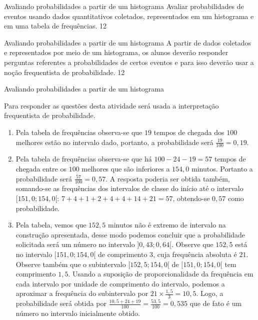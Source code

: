 \begin{objectives}{Avaliando probabilidades a partir de um histograma}
{
Avaliar probabilidades de eventos usando dados quantitativos coletados, representados em um histograma e em uma tabela de frequências.
}{1}{2}
\end{objectives}
\begin{sugestions}{Avaliando probabilidades a partir de um histograma}
{
A partir de dados coletados e representados por meio de um histograma, os alunos deverão responder perguntas referentes a probabilidades de certos eventos e para isso deverão usar a noção frequentista de probabilidade.
}{1}{2}
\end{sugestions}
\clearmargin
\marginpar{\vspace{.5em}}
\begin{answer}{Avaliando probabilidades a partir de um histograma}
{
Para responder as questões desta atividade será usada a interpretação frequentista de probabilidade.

\begin{enumerate}
\item Pela tabela de frequências observa-se que $19$ tempos de chegada dos $100$ melhores estão no intervalo dado, portanto, a probabilidade será $\frac{19}{100}=0{,}19$.

\item Pela tabela de frequências observa-se que há $100−24−19=57$ tempos de chegada entre os $100$ melhores que são inferiores a $154{,}0$ minutos. Portanto a probabilidade será $\frac{57}{100}=0{,}57$. A resposta poderia ser obtida também, somando-se as frequências dos intervalos de classe do início até o intervalo $[151{,}0 ; 154{,}0[$: $7+4+1+2+4+4+14+21=57$, obtendo-se $0{,}57$ como probabilidade.

\item Pela tabela, vemos que $152{,}5$ minutos não é extremo de intervalo na construção apresentada, desse modo podemos concluir que a probabilidade solicitada será um número no intervalo $]0{,}43 ; 0{,}64[$. Observe que $152{,}5$ está no intervalo $[151{,}0 ; 154{,}0[$ de comprimento 3, cuja frequência absoluta é $21$. Observe também que o subintervalo $[152{,}5; 154{,}0[$ de $[151{,}0 ; 154{,}0[$ tem comprimento $1{,}5$. Usando a suposição de proporcionalidade da frequência em cada intervalo por unidade de comprimento do intervalo, podemos a aproximar a frequência do subintervalo por $21\times\frac{1{,}5}{3}=10{,}5$. Logo, a probabilidade será obtida por $\frac{10{,}5+24+19}{100}=\frac{53{,}5}{100}=0{,}535$ que de fato é um número no intervalo inicialmente obtido.


\end{enumerate}}
\end{answer}
